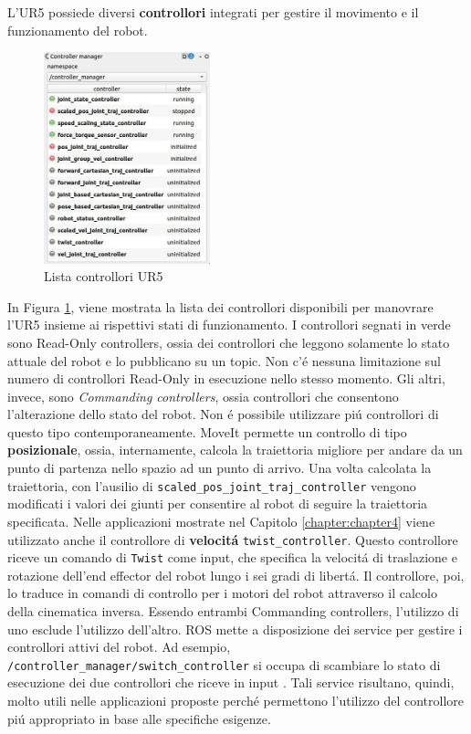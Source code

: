 L'UR5 possiede diversi \textbf{controllori} integrati per gestire il movimento e il funzionamento del robot. 
\begin{figure}[H]
    \centering
    \includegraphics*[width=0.43\textwidth]{images/controller_manager.png}
    \caption{Lista controllori UR5}
    \label{fig:controllers}
\end{figure}
In Figura \ref{fig:controllers}, viene mostrata la lista dei controllori disponibili per manovrare l'UR5 insieme ai rispettivi 
stati di funzionamento. 
I controllori segnati in verde sono Read-Only controllers, ossia dei controllori che leggono solamente lo stato attuale del 
robot e lo pubblicano su un topic. Non c'\'{e} nessuna limitazione sul numero di controllori Read-Only in esecuzione 
nello stesso momento. Gli altri, invece, sono \textit{Commanding controllers}, ossia controllori che consentono l'alterazione dello 
stato del robot. Non \'{e} possibile utilizzare pi\'{u} controllori di questo tipo contemporaneamente. 
MoveIt permette un controllo di tipo \textbf{posizionale}, ossia, internamente, calcola la traiettoria migliore 
per andare da un punto di partenza nello spazio ad un punto di arrivo. 
Una volta calcolata la traiettoria, con l'ausilio di \verb|scaled_pos_joint_traj_controller| 
vengono modificati i valori dei giunti per consentire al robot di seguire la traiettoria specificata. 
Nelle applicazioni mostrate nel Capitolo \ref{chapter:chapter4} viene utilizzato anche il controllore di 
\textbf{velocit\'{a}} \verb|twist_controller|. Questo controllore riceve un comando di \verb|Twist| come input, 
che specifica la velocit\'{a} di traslazione e rotazione dell'end effector del robot lungo i sei gradi di libert\'{a}. 
Il controllore, poi, lo traduce in comandi di controllo per i motori del robot attraverso il calcolo della cinematica inversa.
Essendo entrambi Commanding controllers, l'utilizzo di uno esclude l'utilizzo 
dell'altro. ROS mette a disposizione dei service per gestire i controllori attivi del robot. Ad esempio, 
\verb|/controller_manager/switch_controller| si occupa di scambiare lo stato di esecuzione dei due controllori che riceve 
in input \cite{controller_manager}. Tali service risultano, quindi, molto utili nelle applicazioni proposte perch\'{e} permettono 
l'utilizzo del controllore pi\'{u} appropriato in base alle specifiche esigenze.